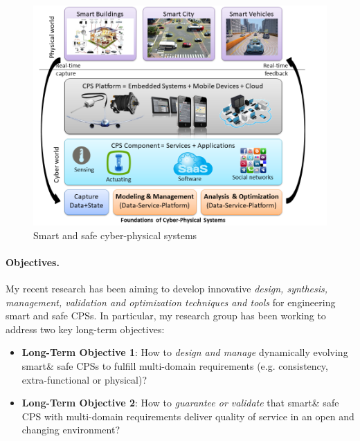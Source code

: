 \begin{figure}
\centering
\includegraphics[width=.7\textwidth]{figures/smart-safe-cps}
\caption{Smart and safe cyber-physical systems}
\label{fig:smart-safe-cps}
\end{figure}


\paragraph{Objectives.}
My recent research has been aiming to develop innovative \emph{design, synthesis, management, validation and optimization techniques and tools}  for engineering smart and safe CPSs. In particular, my research group has been working to address two key long-term objectives:

\begin{itemize}
\item \textbf{Long-Term Objective 1}: How to \emph{design and manage} dynamically evolving smart\& safe CPSs to fulfill multi-domain requirements (e.g. consistency, extra-functional or physical)?
\item \textbf{Long-Term Objective 2}: How to \emph{guarantee or validate} that smart\& safe CPS with multi-domain requirements deliver quality of service in an open and changing environment?
\end{itemize}

